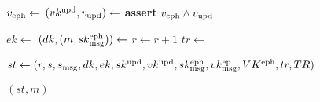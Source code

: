 \begin{minipage}{\linewidth}
{\begin{algorithmic}[1]
    \State $v_\text{eph} \gets$
    \State $(vk^\text{upd},v_\text{upd}) \gets$
    \State \textbf{assert} $v_\text{eph} \wedge v_\text{upd}$

    \State $ek \gets$  
    \State $(dk, (m,sk_\text{msg}^\text{eph})) \gets$
    \State $r \gets r +1$
    \State $tr \gets$ 
    
    \State $st \gets (r,s,s_\text{msg},dk,ek,sk^\text{upd},vk^\text{upd},
                        sk_\text{msg}^\text{eph},vk_\text{msg}^\text{ep},VK^\text{eph},tr,TR)$

    \State \Return $(st,m)$
    \EndProcedure
  \end{algorithmic}
  }
\end{minipage}

